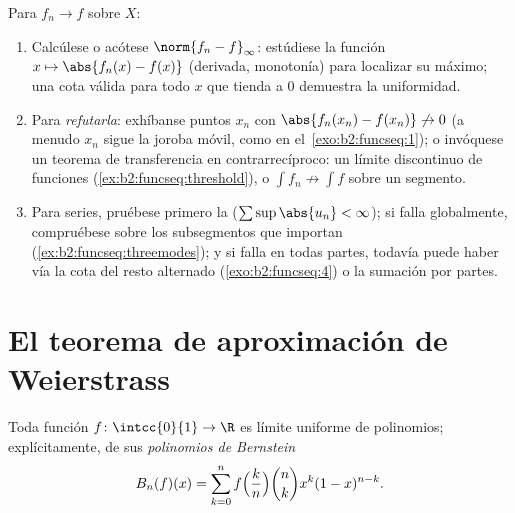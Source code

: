 \begin{method}\label{met:b2:funcseq:uniform}
Para $f_n \to f$  sobre $X$:
\begin{enumerate}
  \item Calcúlese o acótese $\norm{f_n - f}_\infty$: estúdiese la
        función $x \mapsto \abs{f_n(x) - f(x)}$ (derivada,
        monotonía) para localizar su máximo; una cota válida para
        todo $x$ que tienda a $0$ demuestra la uniformidad.
  \item Para \emph{refutarla}: exhíbanse puntos $x_n$ con
        $\abs{f_n(x_n) - f(x_n)} \not\to 0$ (a menudo $x_n$ sigue la
        joroba móvil, como en el~\cref{exo:b2:funcseq:1}); o
        invóquese un teorema de transferencia en contrarrecíproco:
        un límite discontinuo de funciones 
        (\cref{ex:b2:funcseq:threshold}), o $\int f_n \not\to \int
        f$ sobre un segmento.
  \item Para series, pruébese primero la 
        ($\sum\sup\abs{u_n} < \infty$); si falla globalmente,
        compruébese sobre los subsegmentos que importan
        (\cref{ex:b2:funcseq:threemodes}); y si falla en todas
        partes, todavía puede haber  vía la cota
        del resto alternado (\cref{exo:b2:funcseq:4}) o la sumación
        por partes.
\end{enumerate}
\end{method}

\section{El teorema de aproximación de Weierstrass}

\begin{theorem}\label{thm:b2:funcseq:weierstrass}
Toda función  $f \colon \intcc{0}{1} \to \R$ es límite
uniforme de polinomios; explícitamente, de sus \emph{polinomios de
Bernstein}
\[
B_n(f)(x) = \sum_{k=0}^{n} f\Bigl(\frac kn\Bigr)\binom nk x^k
(1-x)^{n-k} .
\]
\end{theorem}

